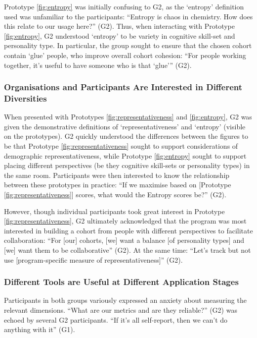 Prototype \ref{fig:entropy} was initially confusing to G2, as the `entropy' definition used was unfamiliar to the participants: ``Entropy is chaos in chemistry. How does this relate to our usage here?'' (G2). Thus, when interacting with Prototype \ref{fig:entropy}, G2 understood `entropy' to be variety in cognitive skill-set and personality type. In particular, the group sought to ensure that the chosen cohort contain `glue' people, who improve overall cohort cohesion: ``For people working together, it's useful to have someone who is that `glue''' (G2). 

\subsubsection{Organisations and Participants Are Interested in Different Diversities}
When presented with Prototypes \ref{fig:representativeness} and \ref{fig:entropy}, G2 was given the demonstrative definitions of `representativeness' and `entropy' (visible on the prototypes). G2 quickly understood the differences between the figures to be that Prototype \ref{fig:representativeness} sought to support considerations of demographic representativeness, while Prototype \ref{fig:entropy} sought to support placing different perspectives (be they cognitive skill-sets or personality types) in the same room. Participants were then interested to know the relationship between these prototypes in practice: ``If we maximise based on [Prototype \ref{fig:representativeness}] scores, what would the Entropy scores be?'' (G2).

However, though individual participants took great interest in Prototype \ref{fig:representativeness}, G2 ultimately acknowledged that the program was most interested in building a cohort from people with different perspectives to facilitate collaboration: ``For [our] cohorts, [we] want a balance [of personality types] and [we] want them to be collaborative'' (G2). At the same time: ``Let's track but not use [program-specific measure of representativeness]'' (G2).

\subsubsection{Different Tools are Useful at Different Application Stages}
Participants in both groups variously expressed an anxiety about measuring the relevant dimensions. ``What are our metrics and are they reliable?'' (G2) was echoed by several G2 participants. ``If it's all self-report, then we can't do anything with it'' (G1). 

